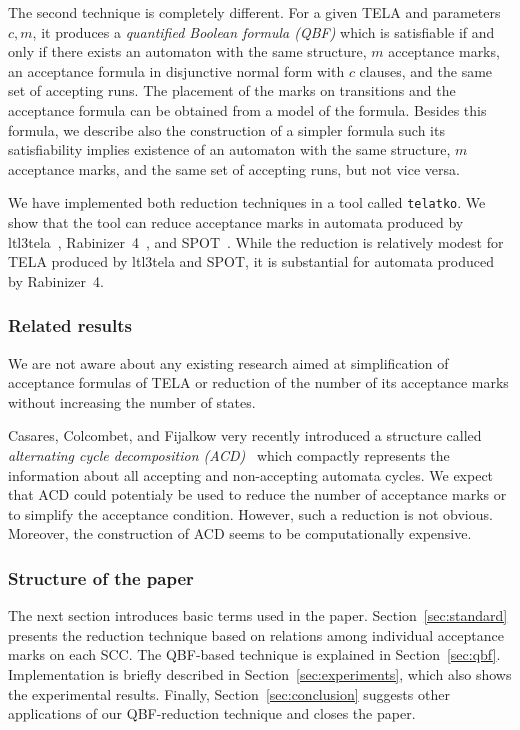 \documentclass[a4paper,UKenglish,cleveref, autoref, thm-restate]{lipics-v2021}
\begin{document}
The second technique is completely different. For a given TELA and
parameters $c,m$, it produces a \emph{quantified Boolean formula
  (QBF)} which is satisfiable if and only if there exists an automaton
with the same structure, $m$ acceptance marks, an acceptance formula
in disjunctive normal form with $c$ clauses, and the same set
of accepting runs. The placement of the marks on transitions and the
acceptance formula can be obtained from a model of the
formula. Besides this formula, we describe also the construction of a
simpler formula such its satisfiability implies existence of an
automaton with the same structure, $m$ acceptance marks, and the same
set of accepting runs, but not vice versa.

We have implemented both reduction techniques in a tool called
\texttt{telatko}. We show that the tool can reduce acceptance marks in
automata produced by ltl3tela~\cite{major.19.atva},
Rabinizer~4~\cite{kretinsky.18.cav}, and SPOT~\cite{duret.16.atva2}.
While the reduction is relatively modest for TELA produced by ltl3tela
and SPOT, it is substantial for automata produced by Rabinizer~4.

\subsubsection{Related results}
We are not aware about any existing research aimed at simplification
of acceptance formulas of TELA or reduction of the number of its
acceptance marks without increasing the number of states.

Casares, Colcombet, and Fijalkow very recently introduced a structure
called \emph{alternating cycle decomposition
  (ACD)}~\cite{casares.21.icalp} which compactly represents the
information about all accepting and non-accepting automata cycles.  We
expect that ACD could potentialy be used to reduce the number of
acceptance marks or to simplify the acceptance condition. However,
such a reduction is not obvious. Moreover, the construction of ACD
seems to be computationally expensive.

\subsubsection{Structure of the paper} The next section introduces
basic terms used in the paper. Section~\ref{sec:standard} presents the
reduction technique based on relations among individual acceptance
marks on each SCC. The QBF-based technique is explained in
Section~\ref{sec:qbf}. Implementation is briefly described in
Section~\ref{sec:experiments}, which also shows the experimental
results. Finally, Section~\ref{sec:conclusion} suggests other
applications of our QBF-reduction technique and closes the paper.
\end{document}
